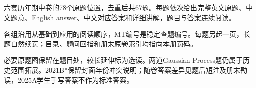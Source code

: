
六套历年期中卷的78个原题位置，去重后共67题。每题依次给出完整英文原题、中文题意、English answer、中文对应答案和详细讲解，题目与答案连续阅读。


各组沿用从基础到应用的阅读顺序，MT编号是稳定查题编号。每题另起一页，长题自然续页；目录、题间回指和册末原卷索引均指向本册页码。


必要原题图保留在题目处，较长延伸标为选读。两道Gaussian Process题仍属于历史范围拓展。2021B*保留封面年份冲突说明；随卷答案差异见题后短注及册末勘误，2025A学生手写答案不作为标准答案。

